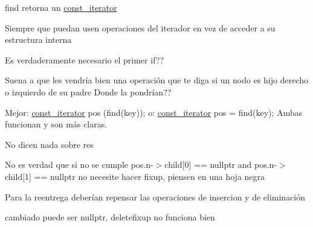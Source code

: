 
\begin{DoxyRefList}
\item[\label{bug__bug000006}%
\hypertarget{bug__bug000006}{}%
Miembro \hyperlink{classaed2_1_1map_a0b0a11f906da2926f9eb342fcee79fd7_a0b0a11f906da2926f9eb342fcee79fd7}{aed2\+:\+:map$<$ Key, Meaning, Compare $>$\+:\+:at} (const Key \&key) const ]find retorna un \hyperlink{classaed2_1_1map_1_1const__iterator}{const\+\_\+iterator} 

Siempre que puedan usen operaciones del iterador en vez de acceder a su estructura interna 
\item[\label{bug__bug000019}%
\hypertarget{bug__bug000019}{}%
Miembro \hyperlink{classaed2_1_1map_a2bfa5165825979bf2431db55bc6bc9ca_a2bfa5165825979bf2431db55bc6bc9ca}{aed2\+:\+:map$<$ Key, Meaning, Compare $>$\+:\+:clear} ()]Es verdaderamente necesario el primer if?? 
\item[\label{bug__bug000022}%
\hypertarget{bug__bug000022}{}%
Miembro \hyperlink{classaed2_1_1map_af2eed16fe5e8bdbe5a9d979a5d136732_af2eed16fe5e8bdbe5a9d979a5d136732}{aed2\+:\+:map$<$ Key, Meaning, Compare $>$\+:\+:delete\+Fix\+Up} (\hyperlink{structaed2_1_1map_1_1Node}{Node} $\ast$nodo)]Suena a que les vendría bien una operación que te diga si un nodo es hijo derecho o izquierdo de su padre Donde la pondrían?? 
\item[\label{bug__bug000018}%
\hypertarget{bug__bug000018}{}%
Miembro \hyperlink{classaed2_1_1map_a2ffadb42cd5f0bc7b3752ff159b75334_a2ffadb42cd5f0bc7b3752ff159b75334}{aed2\+:\+:map$<$ Key, Meaning, Compare $>$\+:\+:erase} (const Key \&key)]Mejor\+: \hyperlink{classaed2_1_1map_1_1const__iterator}{const\+\_\+iterator} pos (find(key)); o\+: \hyperlink{classaed2_1_1map_1_1const__iterator}{const\+\_\+iterator} pos = find(key); Ambas funcionan y son más claras. 
\item[\label{bug__bug000016}%
\hypertarget{bug__bug000016}{}%
Miembro \hyperlink{classaed2_1_1map_ad8e796bf9c9c558e5ce6b61e116253fe_ad8e796bf9c9c558e5ce6b61e116253fe}{aed2\+:\+:map$<$ Key, Meaning, Compare $>$\+:\+:erase} (\hyperlink{classaed2_1_1map_1_1const__iterator}{const\+\_\+iterator} pos)]No dicen nada sobre res 

No es verdad que si no se cumple pos.\+n-\/$>$child\mbox{[}0\mbox{]} == nullptr and pos.\+n-\/$>$child\mbox{[}1\mbox{]} == nullptr no necesite hacer fixup, piensen en una hoja negra 

Para la reentrega deberían repensar las operaciones de insercion y de eliminación 

cambiado puede ser nullptr, deletefixup no funciona bien


\end{DoxyRefList}
